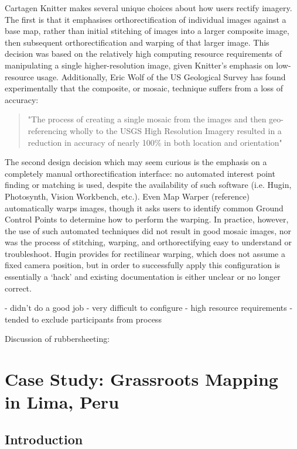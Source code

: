\documentclass[11pt]{report}
\begin{document}
Cartagen Knitter makes several unique choices about how users rectify imagery. The first is that it emphasises orthorectification of individual images against a base map, rather than initial stitching of images into a larger composite image, then subsequent orthorectification and warping of that larger image. This decision was based on the relatively high computing resource requirements of manipulating a single higher-resolution image, given Knitter's emphasis on low-resource usage. Additionally, Eric Wolf of the US Geological Survey has found experimentally that the composite, or mosaic, technique suffers from a loss of accuracy: 

\begin{quote}
"The process of creating a single mosaic from the images and then geo-referencing wholly to the USGS High Resolution Imagery resulted in a reduction in accuracy of nearly 100\% in both location and orientation"
\cite{wolf2006lowcost}
\end{quote}

The second design decision which may seem curious is the emphasis on a completely manual orthorectification interface: no automated interest point finding or matching is used, despite the availability of such software (i.e. Hugin, Photosynth, Vision Workbench, etc.). Even Map Warper (reference) automatically warps images, though it asks users to identify common Ground Control Points to determine how to perform the warping. In practice, however, the use of such automated techniques did not result in good mosaic images, nor was the process of stitching, warping, and orthorectifying easy to understand or troubleshoot. Hugin provides for rectilinear warping, which does not assume a fixed camera position, but in order to successfully apply this configuration is essentially a `hack' and existing documentation is either unclear or no longer correct.



- didn't do a good job
- very difficult to configure
- high resource requirements
- tended to exclude participants from process

Discussion of rubbersheeting:
\cite{white1985piecewise}

\chapter{Case Study: Grassroots Mapping in Lima, Peru}
\label{chap:peru}

\section{Introduction}
\end{document}

